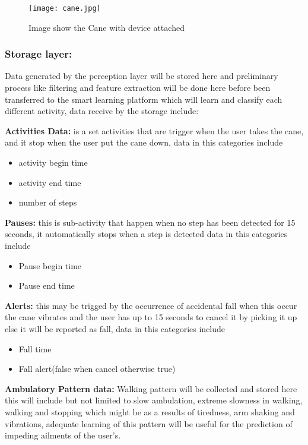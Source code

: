 \documentclass[a4paper, parskip=full]{scrartcl}
\begin{document}
\begin{figure}
	\centering
	\texttt{[image: cane.jpg]}
	
	\caption{Image show the Cane with device attached }
	
\end{figure}



\subsubsection*{Storage layer:} Data generated by the perception layer will be stored here and preliminary process like filtering and feature extraction will be done here before been transferred to the smart learning platform which will learn and classify each different activity, data receive by the storage include:

\textbf{Activities Data:} is a set activities that are trigger when the user takes the cane, and it stop when the user put the cane down, data in this categories include 


\begin{itemize}
	
	\item   activity begin time
	
	\item  activity end time
	
	\item   number of steps	
	
\end{itemize}

\textbf{Pauses:} this is sub-activity that happen when no step has been detected for 15 seconds, it automatically stops when a step is detected data in this categories include 
\begin{itemize}
	
	\item   Pause begin time
	
	\item   Pause end time	
	
\end{itemize}

\textbf{Alerts:} this may be trigged by the occurrence of accidental fall when this occur the cane vibrates and the user has up to 15 seconds to cancel it by picking it up else it will be reported as fall,  data in this categories include

\begin{itemize}
	\item   Fall time
	
	\item   Fall alert(false when cancel otherwise true)
\end{itemize}
\textbf{Ambulatory Pattern data:} Walking pattern will be collected and stored here this will include but not limited to slow ambulation, extreme slowness in walking, walking and stopping which might be as a results of tiredness, arm shaking and vibrations, adequate learning of this pattern will be useful for the prediction of impeding ailments of the user’s. 
\end{document}
